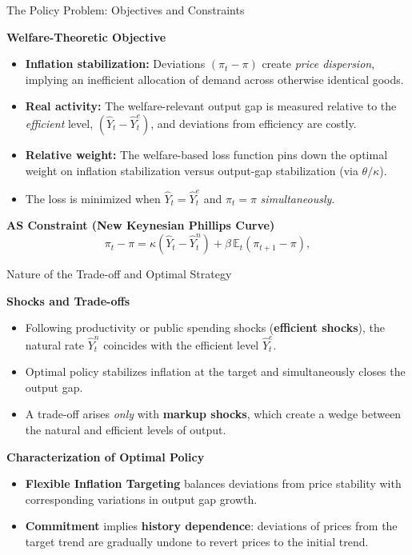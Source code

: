 \documentclass[11pt,aspectratio=169]{beamer}
\begin{document}
\begin{frame}{The Policy Problem: Objectives and Constraints}
\small

\textbf{Welfare-Theoretic Objective}
\begin{itemize}
  \item \textbf{Inflation stabilization:} Deviations $(\pi_t-\pi)$ create \emph{price dispersion}, implying an inefficient allocation of demand across otherwise identical goods.
  \item \textbf{Real activity:} The welfare-relevant output gap is measured relative to the \emph{efficient} level, $(\hat{Y}_t-\hat{Y}_t^{e})$, and deviations from efficiency are costly.
  \item \textbf{Relative weight:} The welfare-based loss function pins down the optimal weight on inflation stabilization versus output-gap stabilization (via $\theta/\kappa$).
  \item The loss is minimized when $\hat{Y}_t=\hat{Y}_t^{e}$ and $\pi_t=\pi$ \emph{simultaneously}.
\end{itemize}

\vspace{0.15cm}

\textbf{AS Constraint (New Keynesian Phillips Curve)}
\begin{equation}
\pi_t-\pi
= \kappa(\hat{Y}_t-\hat{Y}_t^{n}) + \beta\,\mathbb{E}_t(\pi_{t+1}-\pi),
\label{AS-7}
\end{equation}

\end{frame}


\begin{frame}{Nature of the Trade-off and Optimal Strategy}
\small

\textbf{Shocks and Trade-offs}
\begin{itemize}
  \item Following productivity or public spending shocks (\textbf{efficient shocks}), the natural rate $\hat{Y}_{t}^{n}$ coincides with the efficient level $\hat{Y}_{t}^{e}$.
  \item Optimal policy stabilizes inflation at the target and simultaneously closes the output gap.
  \item A trade-off arises \emph{only} with \textbf{markup shocks}, which create a wedge between the natural and efficient levels of output.
\end{itemize}

\vspace{0.3cm}

\textbf{Characterization of Optimal Policy}
\begin{itemize}
  \item \textbf{Flexible Inflation Targeting} balances deviations from price stability with corresponding variations in output gap growth.
  \item \textbf{Commitment} implies \textbf{history dependence}: deviations of prices from the target trend are gradually undone to revert prices to the initial trend.
\end{itemize}

\end{frame}
\end{document}
